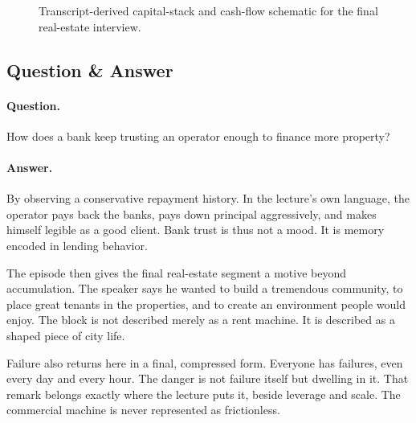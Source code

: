 \begin{figure}[h]
\centering
{}
\caption{Transcript-derived capital-stack and cash-flow schematic for the final real-estate interview.}
\end{figure}

\subsection{Question \& Answer}

\paragraph{Question.} How does a bank keep trusting an operator enough to finance more property?

\paragraph{Answer.} By observing a conservative repayment history. In the lecture's own language, the operator pays back the banks, pays down principal aggressively, and makes himself legible as a good client. Bank trust is thus not a mood. It is memory encoded in lending behavior.

The episode then gives the final real-estate segment a motive beyond accumulation. The speaker says he wanted to build a tremendous community, to place great tenants in the properties, and to create an environment people would enjoy. The block is not described merely as a rent machine. It is described as a shaped piece of city life.

Failure also returns here in a final, compressed form. Everyone has failures, even every day and every hour. The danger is not failure itself but dwelling in it. That remark belongs exactly where the lecture puts it, beside leverage and scale. The commercial machine is never represented as frictionless.

